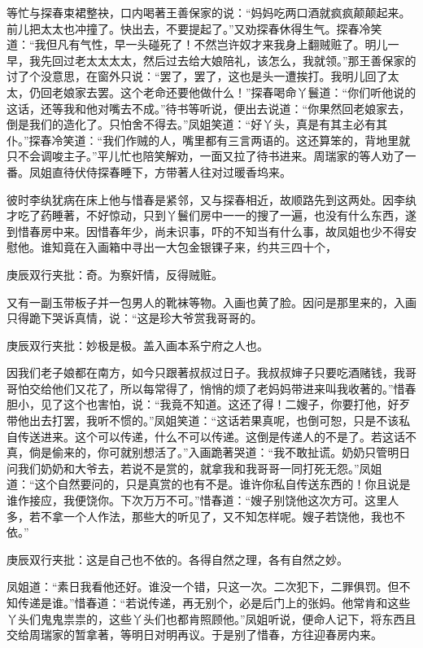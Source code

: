 \begin{parag}
等忙与探春束裙整袂，口内喝著王善保家的说：“妈妈吃两口酒就疯疯颠颠起来。前儿把太太也冲撞了。快出去，不要提起了。”又劝探春休得生气。探春冷笑道：“我但凡有气性，早一头碰死了！不然岂许奴才来我身上翻贼赃了。明儿一早，我先回过老太太太太，然后过去给大娘陪礼，该怎么，我就领。”那王善保家的讨了个没意思，在窗外只说：“罢了，罢了，这也是头一遭挨打。我明儿回了太太，仍回老娘家去罢。这个老命还要他做什么！”探春喝命丫鬟道：“你们听他说的这话，还等我和他对嘴去不成。”待书等听说，便出去说道：“你果然回老娘家去，倒是我们的造化了。只怕舍不得去。”凤姐笑道：“好丫头，真是有其主必有其仆。”探春冷笑道：“我们作贼的人，嘴里都有三言两语的。这还算笨的，背地里就只不会调唆主子。”平儿忙也陪笑解劝，一面又拉了待书进来。周瑞家的等人劝了一番。凤姐直待伏侍探春睡下，方带著人往对过暖香坞来。
\end{parag}


\begin{parag}


    彼时李纨犹病在床上他与惜春是紧邻，又与探春相近，故顺路先到这两处。因李纨才吃了药睡著，不好惊动，只到丫鬟们房中一一的搜了一遍，也没有什么东西，遂到惜春房中来。因惜春年少，尚未识事，吓的不知当有什么事，故凤姐也少不得安慰他。谁知竟在入画箱中寻出一大包金银锞子来，约共三四十个，\begin{note}庚辰双行夹批：奇。为察奸情，反得贼赃。\end{note}又有一副玉带板子并一包男人的靴袜等物。入画也黄了脸。因问是那里来的，入画只得跪下哭诉真情，说：“这是珍大爷赏我哥哥的。\begin{note}庚辰双行夹批：妙极是极。盖入画本系宁府之人也。\end{note}因我们老子娘都在南方，如今只跟著叔叔过日子。我叔叔婶子只要吃酒赌钱，我哥哥怕交给他们又花了，所以每常得了，悄悄的烦了老妈妈带进来叫我收著的。”惜春胆小，见了这个也害怕，说：“我竟不知道。这还了得！二嫂子，你要打他，好歹带他出去打罢，我听不惯的。”凤姐笑道：“这话若果真呢，也倒可恕，只是不该私自传送进来。这个可以传递，什么不可以传递。这倒是传递人的不是了。若这话不真，倘是偷来的，你可就别想活了。”入画跪著哭道：“我不敢扯谎。奶奶只管明日问我们奶奶和大爷去，若说不是赏的，就拿我和我哥哥一同打死无怨。”凤姐道：“这个自然要问的，只是真赏的也有不是。谁许你私自传送东西的！你且说是谁作接应，我便饶你。下次万万不可。”惜春道：“嫂子别饶他这次方可。这里人多，若不拿一个人作法，那些大的听见了，又不知怎样呢。嫂子若饶他，我也不依。”\begin{note}庚辰双行夹批：这是自己也不依的。各得自然之理，各有自然之妙。\end{note}凤姐道：“素日我看他还好。谁没一个错，只这一次。二次犯下，二罪俱罚。但不知传递是谁。”惜春道：“若说传递，再无别个，必是后门上的张妈。他常肯和这些丫头们鬼鬼祟祟的，这些丫头们也都肯照顾他。”凤姐听说，便命人记下，将东西且交给周瑞家的暂拿著，等明日对明再议。于是别了惜春，方往迎春房内来。
\end{parag}


